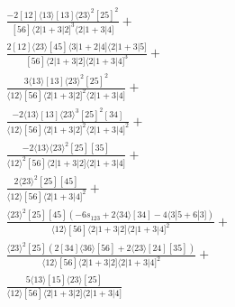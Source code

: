 \documentclass[varwidth, border=5pt]{standalone}
\begin{document}
\begin{my}
$\begin{gathered}
\scriptscriptstyle\frac{-2[12]⟨13⟩[13]⟨23⟩^2[25]^2}{[56]⟨2|1+3|2]^3⟨2|1+3|4]}+\\
\scriptscriptstyle\frac{2[12]⟨23⟩[45]⟨3|1+2|4]⟨2|1+3|5]}{[56]⟨2|1+3|2]⟨2|1+3|4]^3}+\\
\scriptscriptstyle\frac{3⟨13⟩[13]⟨23⟩^2[25]^2}{⟨12⟩[56]⟨2|1+3|2]^2⟨2|1+3|4]}+\\
\scriptscriptstyle\frac{-2⟨13⟩[13]⟨23⟩^3[25]^2[34]}{⟨12⟩[56]⟨2|1+3|2]^2⟨2|1+3|4]^2}+\\
\scriptscriptstyle\frac{-2⟨13⟩⟨23⟩^2[25][35]}{⟨12⟩^2[56]⟨2|1+3|2]⟨2|1+3|4]}+\\
\scriptscriptstyle\frac{2⟨23⟩^2[25][45]}{⟨12⟩[56]⟨2|1+3|4]^2}+\\
\scriptscriptstyle\frac{⟨23⟩^2[25][45](-6s_{123}+2⟨34⟩[34]-4⟨3|5+6|3])}{⟨12⟩[56]⟨2|1+3|2]⟨2|1+3|4]^2}+\\
\scriptscriptstyle\frac{⟨23⟩^2[25](2[34]⟨36⟩[56]+2⟨23⟩[24][35])}{⟨12⟩[56]⟨2|1+3|2]⟨2|1+3|4]^2}+\\
\scriptscriptstyle\frac{5⟨13⟩[15]⟨23⟩[25]}{⟨12⟩[56]⟨2|1+3|2]⟨2|1+3|4]}\phantom{+}
\end{gathered}$
\end{my}
\end{document}

